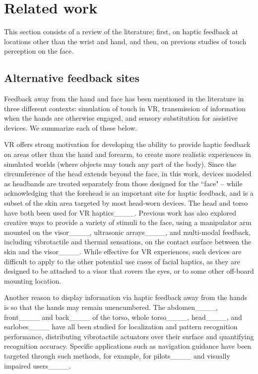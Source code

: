 \section{Related work}
This section consists of a review of the literature; first, on haptic feedback at locations other than the wrist and hand, and then, on previous studies of touch perception on the face.
\subsection{Alternative feedback sites}
\label{sc:elsewhere}
Feedback away from the hand and face has been mentioned in the literature in three different contexts: simulation of touch in VR, transmission of information when the hands are otherwise engaged, and sensory substitution for assistive devices. We summarize each of these below.

VR offers strong motivation for developing the ability to provide haptic feedback on areas other than the hand and forearm, to create more realistic experiences in simulated worlds (where objects may touch any part of the body). Since the circumference of the head extends beyond the face, in this work, devices modeled as headbands are treated separately from those designed for the ``face" -- while acknowledging that the forehead is an important site for haptic feedback, and is a subset of the skin area targeted by most head-worn devices. The head and torso have both been used for VR haptics____. Previous work has also explored creative ways to provide a variety of stimuli to the face, using a manipulator arm mounted on the visor____, ultrasonic arrays____, and multi-modal feedback, including vibrotactile and thermal sensations, on the contact surface between the skin and the visor____. While effective for VR experiences, such devices are difficult to apply to the other potential use cases of facial haptics, as they are designed to be attached to a visor that covers the eyes, or to some other off-board mounting location.

Another reason to display information via haptic feedback away from the hands is so that the hands may remain unencumbered. The abdomen____, front____ and back____ of the torso, whole torso____, head____, and earlobes____ have all been studied for localization and pattern recognition performance, distributing vibrotactile actuators over their surface and quantifying recognition accuracy. Specific applications such as navigation guidance have been targeted through such methods, for example, for pilots____ and visually impaired users____.

